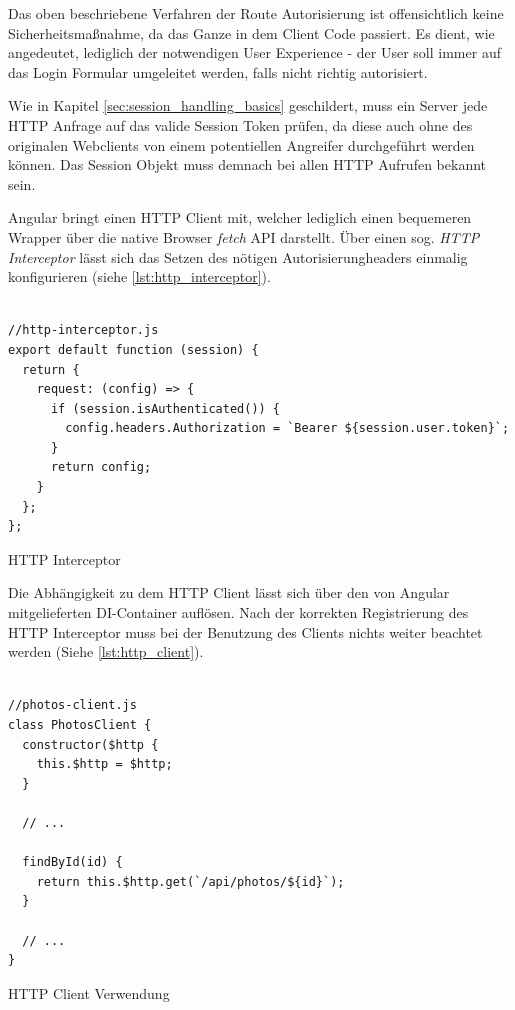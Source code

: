 Das oben beschriebene Verfahren der Route Autorisierung ist offensichtlich keine Sicherheitsmaßnahme, da das Ganze in dem Client Code passiert. Es dient, wie angedeutet, lediglich der notwendigen User Experience - der User soll immer auf das Login Formular umgeleitet werden, falls nicht richtig autorisiert.

Wie in Kapitel \ref{sec:session_handling_basics} geschildert, muss ein Server jede HTTP Anfrage auf das valide Session Token prüfen, da diese auch ohne des originalen Webclients von einem potentiellen Angreifer durchgeführt werden können. Das Session Objekt muss demnach bei allen HTTP Aufrufen bekannt sein.

Angular bringt einen HTTP Client mit, welcher lediglich einen bequemeren Wrapper über die native Browser \textit{fetch} API darstellt. Über einen sog. \textit{HTTP Interceptor} lässt sich das Setzen des nötigen Autorisierungheaders einmalig konfigurieren (siehe \ref{lst:http_interceptor}).

\begin{listing}[H]
\begin{verbatim}

//http-interceptor.js
export default function (session) {
  return {
    request: (config) => {
      if (session.isAuthenticated()) {
        config.headers.Authorization = `Bearer ${session.user.token}`;
      }
      return config;
    }
  };
};

\end{verbatim}
\caption{HTTP Interceptor}
\label{lst:http_interceptor}
\end{listing}

Die Abhängigkeit zu dem HTTP Client lässt sich über den von Angular mitgelieferten DI-Container auflösen. Nach der korrekten Registrierung des HTTP Interceptor muss bei der Benutzung des Clients nichts weiter beachtet werden (Siehe \ref{lst:http_client}).

\begin{listing}[H]
\begin{verbatim}

//photos-client.js
class PhotosClient {
  constructor($http {
    this.$http = $http;
  }

  // ...

  findById(id) {
    return this.$http.get(`/api/photos/${id}`);
  }

  // ...
}

\end{verbatim}
\caption{HTTP Client Verwendung}
\label{lst:http_client}
\end{listing}

